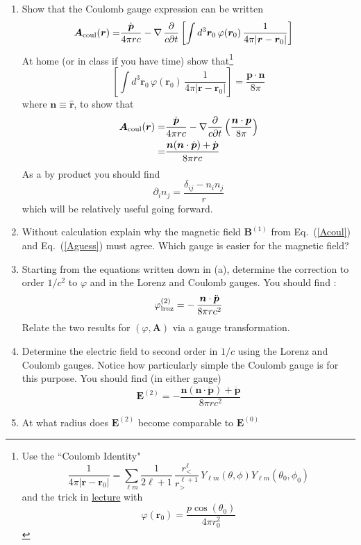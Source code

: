 \documentclass[12pt]{article}
\def\E{{\bm E}}
\def\B{{\bm B}}
\def\A{{\bm A}}
\def\n{{\bm n}}
\def\p{{\bm p}}
\def\r{{\bm r}}
\def\n{{\bm n}}
\def\st{\begin{equation}}
\def\stp{\end{equation}}
\def\Eq#1{Eq.~(\ref{#1})}
\begin{document}
\begin{enumerate}
\item  Show that the Coulomb gauge expression  
   can be written
      \begin{align}
     \A_{\rm coul}(\r) =&  
             \frac{\dot {\bm p} }{4\pi r c} 
             - \nabla \, \frac{\partial}{c \partial t} 
             \left[ \int d^3\r_0 \, \varphi(\r_0) \, 
             \frac{1}{4\pi|\r - \r_0|} \right] 
      \end{align}
      At home (or in class if you have time) show that\footnote{ Use the ``Coulomb Identity" 
   \st
      \frac{1}{4\pi|\r - \r_0|}  = \sum_{\ell m} \frac{1}{2\ell + 1} \, \frac{r_{<}^\ell}{ r_>^{\ell+1} } \,  Y_{\ell m}(\theta,\phi)  Y_{\ell m}(\theta_0,\phi_0)
   \stp
      and the trick in \href{http://tonic.physics.sunysb.edu/~dteaney/S18_Phy505/lectures/magneto_sphere.pdf}{lecture} with 
      \st
       \varphi(\r_0) =  \frac{p \cos(\theta_0) }{4\pi r_0^2 }
      \stp}
      \st
      \left[ \int d^3\r_0 \, \varphi(\r_0) \, 
             \frac{1}{4\pi|\r - \r_0|} \right]  = \frac{\p \cdot \n}{8\pi}
      \stp
      where $\n \equiv \hat{\r}$,  to show that
      \begin{subequations}
         \label{Acoul}
      \begin{align}
     \A_{\rm coul}(\r) =&   
             \frac{ \dot{\bm p} }{4\pi r c} -  \nabla \frac{\partial}{c \partial t} \left( \frac{\n \cdot \p}{8\pi } \right) \\
         =& \frac{ \n (\n \cdot \dot \p) + \dot \p}{8\pi rc } 
     \end{align}
      \end{subequations}
      As a by product you should find 
      \st
        \partial_i n_j = \frac{\delta_{ij} - n_i n_j}{r}
      \stp
      which will be relatively useful going forward.
      

   \item Without calculation explain why the magnetic field $\B^{(1)}$ from \Eq{Acoul} and \Eq{Aguess} must agree.  Which gauge is easier for the magnetic field?

   \item Starting from the equations written down in (a), determine the correction to  order $1/c^2$ to $\varphi$ and in the Lorenz and Coulomb gauges. You should find :  
      \st
           \varphi^{(2)}_{\rm lrnz} =  - \, \frac{\n \cdot \ddot \p }{8\pi r c^2}
      \stp
      Relate the two results for $(\varphi, \A) $ via a gauge transformation. 

   \item Determine the electric field to second order in $1/c$ using
      the Lorenz and Coulomb gauges. Notice how particularly
      simple the  Coulomb gauge is for this purpose.  You
      should find (in either gauge) 
      \st
        \E^{(2)} =  - \frac{ \n (\n\cdot \ddot \p) + \ddot \p }{8\pi r c^2} 
      \stp

    \item At what radius does $\E^{(2)}$ become comparable to $\E^{(0)}$

\end{enumerate}
\end{document}
